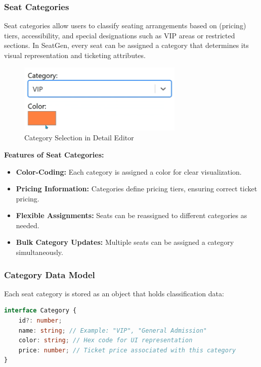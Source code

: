 \subsubsection{Seat Categories}

Seat categories allow users to classify seating arrangements based on (pricing) tiers, accessibility, and special designations such as VIP areas or restricted sections. In SeatGen, every seat can be assigned a category that determines its visual representation and ticketing attributes.

\begin{figure}[H]
    \centering
    \includegraphics[width=0.7\textwidth]{pics/DetailEditorCategory.png}
    \caption{Category Selection in Detail Editor}
    \label{fig:detail-editor-category}
\end{figure}

\textbf{Features of Seat Categories:}
\begin{itemize}
    \item \textbf{Color-Coding:} Each category is assigned a color for clear visualization.
    \item \textbf{Pricing Information:} Categories define pricing tiers, ensuring correct ticket pricing.
    \item \textbf{Flexible Assignments:} Seats can be reassigned to different categories as needed.
    \item \textbf{Bulk Category Updates:} Multiple seats can be assigned a category simultaneously.
\end{itemize}

\subsubsection{Category Data Model}

Each seat category is stored as an object that holds classification data:

\begin{lstlisting}[language=TypeScript, caption=Seat Category Data Model, label=lst:seat-category-model]
interface Category {
    id?: number;
    name: string; // Example: "VIP", "General Admission"
    color: string; // Hex code for UI representation
    price: number; // Ticket price associated with this category
}
\end{lstlisting}

